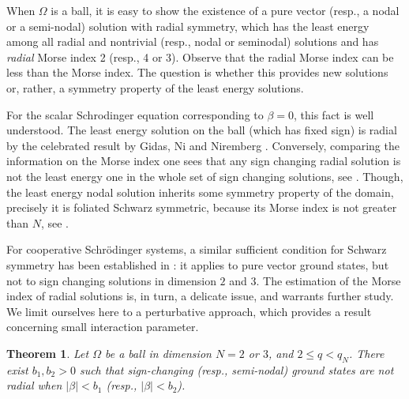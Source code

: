 \documentclass[10pt,a4paper]{amsart}
\numberwithin{equation}{section}
\newtheorem{theorem}[theo]{Theorem}
\begin{document}
 When $\Omega$ is a ball, it is easy to show the existence of a pure vector
 (resp., a nodal or a semi-nodal) solution with radial symmetry,  which has the
least energy among all radial and nontrivial (resp., nodal or seminodal) solutions
and has \emph{radial} Morse index 2 (resp., 4 or 3).
Observe that the radial Morse index can be less than the Morse index.
The question is whether this provides new solutions or, rather, a symmetry property
of the least energy solutions.

For the scalar Schrodinger equation corresponding to $\beta=0$, this fact is well
understood. The least energy solution on the ball (which has fixed sign) is radial
by the celebrated result by Gidas, Ni and Niremberg \cite{GNN}.
Conversely, comparing the information on the Morse index one sees that any sign
changing radial solution  is not the least energy one in the whole set of sign
changing solutions, see \cite{AftPac}.
Though, the least energy nodal solution inherits some symmetry property of the
domain, precisely it is foliated Schwarz symmetric, because its Morse index is not
greater than $N$, see \cite{PacWet}.

For cooperative Schr\"odinger  systems, a similar sufficient condition for Schwarz
symmetry has been established in \cite{DamPac}: it applies to pure vector ground states,
but not to sign changing solutions in dimension $2$ and $3$.
The estimation of the Morse index of radial solutions  is, in turn, a delicate issue,
and warrants further study.
We limit ourselves here to a perturbative approach, which provides a result concerning
small interaction parameter.

\begin{theorem}\label{thm:symmetry_breaking}
Let $\Omega$ be a ball in dimension $N=2$ or $3$, and $2\le q<q_N$.
There exist $b_1  , b_2> 0$ such that sign-changing (resp., semi-nodal) ground states
are not radial when $|\beta|<b_1$ (resp., $|\beta|<b_2$).
\end{theorem}
\end{document}
